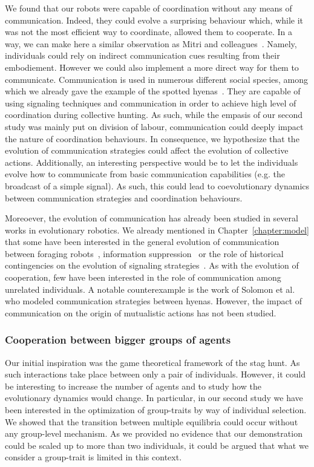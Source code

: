 			We found that our robots were capable of coordination without any means of communication. Indeed, they could evolve a surprising behaviour which, while it was not the most efficient way to coordinate, allowed them to cooperate. In a way, we can make here a similar observation as Mitri and colleagues~\parencite{Mitri2009}. Namely, individuals could rely on indirect communication cues resulting from their embodiement. However we could also implement a more direct way for them to communicate. Communication is used in numerous different social species, among which we already gave the example of the spotted hyenas~\parencite{Drea2009a, Smith2010, Smith2012a}. They are capable of using signaling techniques and communication in order to achieve high level of coordination during collective hunting. As such, while the empasis of our second study was mainly put on division of labour, communication could deeply impact the nature of coordination behaviours. In consequence, we hypothesize that the evolution of communication strategies could affect the evolution of collective actions. Additionally, an interesting perspective would be to let the individuals evolve how to communicate from basic communication capabilities (e.g. the broadcast of a simple signal). As such, this could lead to coevolutionary dynamics between communication strategies and coordination behaviours.

			Moreoever, the evolution of communication has already been studied in several works in evolutionary robotics. We already mentioned in Chapter~\ref{chapter:model} that some have been interested in the general evolution of communication between foraging robots~\parencite{Floreano2007}, information suppression~\parencite{Mitri2009} or the role of historical contingencies on the evolution of signaling strategies~\parencite{Wischmann2012}. As with the evolution of cooperation, few have been interested in the role of communication among unrelated individuals. A notable counterexample is the work of Solomon et al.~\parencite{Solomon2012} who modeled communication strategies between hyenas. However, the impact of communication on the origin of mutualistic actions has not been studied.


		\subsubsection{Cooperation between bigger groups of agents}

			Our initial inspiration was the game theoretical framework of the stag hunt. As such interactions take place between only a pair of individuals. However, it could be interesting to increase the number of agents and to study how the evolutionary dynamics would change. In particular, in our second study we have been interested in the optimization of group-traits by way of individual selection. We showed that the transition between multiple equilibria could occur without any group-level mechanism. As we provided no evidence that our demonstration could be scaled up to more than two individuals, it could be argued that what we consider a group-trait is limited in this context. 

